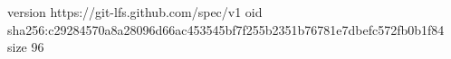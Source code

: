 version https://git-lfs.github.com/spec/v1
oid sha256:c29284570a8a28096d66ac453545bf7f255b2351b76781e7dbefc572fb0b1f84
size 96
